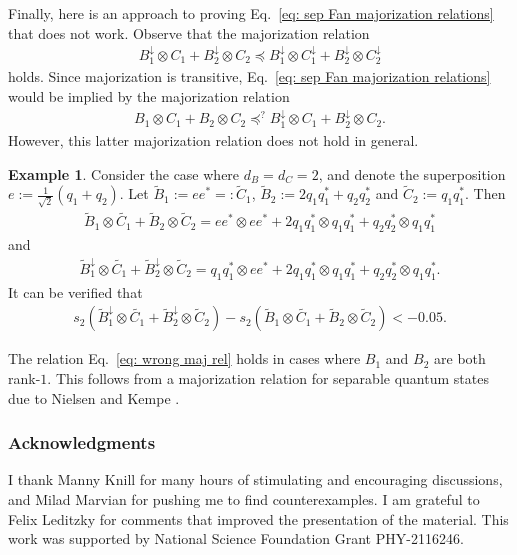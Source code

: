 \documentclass[12pt]{article}
\theoremstyle{definition}
\newtheorem{example}[thm]{Example}
\numberwithin{equation}{section}
\numberwithin{equation}{section}
\newcommand{\da}{\downarrow}
\begin{document}
Finally, here is an approach to proving Eq.~\ref{eq: sep Fan majorization relations} that does not work. Observe that the majorization relation
\begin{align}
    B_1^\da \otimes C_1 + B_2^\da \otimes C_2 \preceq  B_1^\da \otimes C_1^\da + B_2^\da \otimes C_2^\da
\end{align}
holds. Since majorization is transitive, Eq.~\ref{eq: sep Fan majorization relations} would be implied by the majorization relation
\begin{align}
\label{eq: wrong maj rel}
B_1 \otimes C_1 + B_2 \otimes C_2 \preceq^?  B_1^\da \otimes C_1 + B_2^\da \otimes C_2.
\end{align}
However, this latter majorization relation does not hold in general. 
\begin{example}
\label{ex: counter example to one da}
Consider the case where \(d_B = d_C = 2\), and denote the superposition \(e := \frac{1}{\sqrt{2}} (q_1 + q_2)\). Let \(\tilde{B}_1 := e e^* =:\tilde{C}_1\), \(\tilde{B}_2 := 2 q_1 q_1^* + q_2 q_2^*\) and \(\tilde{C}_2 := q_1 q_1^*\). Then
\begin{gather}
\tilde{B}_1 \otimes \tilde{C_1} + \tilde{B}_2 \otimes \tilde{C}_2 = e e^* \otimes e e^* + 2 q_1 q_1^* \otimes q_1 q_1^* + q_2 q_2^* \otimes q_1 q_1^*
\end{gather}
and 
\begin{gather}
\tilde{B}^\da_1 \otimes \tilde{C_1} + \tilde{B}^\da_2 \otimes \tilde{C}_2 = q_1 q_1^* \otimes e e^* +  2 q_1 q_1^* \otimes q_1 q_1^* + q_2 q_2^* \otimes q_1 q_1^*.
\end{gather}
It can be verified that 
\begin{gather}
s_2 (\tilde{B}^\da_1 \otimes \tilde{C_1} + \tilde{B}^\da_2 \otimes \tilde{C}_2) - s_2(\tilde{B}_1 \otimes \tilde{C_1} + \tilde{B}_2 \otimes \tilde{C}_2) < -0.05.    
\end{gather}
\end{example}
The relation Eq.~\ref{eq: wrong maj rel} holds in cases where \(B_1\) and \(B_2\) are both rank-\(1\). This follows from a majorization relation for separable quantum states due to Nielsen and Kempe \cite{Nielsen2001}. 

\subsubsection*{Acknowledgments}
I thank Manny Knill for many hours of stimulating and encouraging discussions, and Milad Marvian for pushing me to find counterexamples. I am grateful to Felix Leditzky for comments that improved the presentation of the material. This work was supported by National Science Foundation Grant PHY-2116246.
\end{document}
